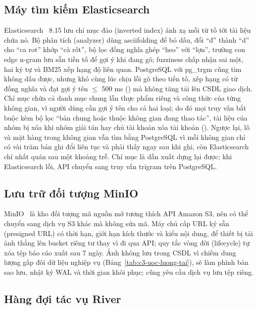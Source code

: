 \subsection{Máy tìm kiếm Elasticsearch}\label{ssec:cn-elasticsearch}

Elasticsearch~\cite{elasticsearch} 8.15 lưu chỉ mục đảo (inverted index) ánh xạ mỗi từ tố tới tài liệu chứa nó. Bộ phân tích (analyzer) dùng asciifolding để bỏ dấu, đổi “đ” thành “d” cho “ca rot” khớp “cà rốt”, bộ lọc đồng nghĩa ghép “heo” với “lợn”, trường con edge n-gram lưu sẵn tiền tố để gợi ý khi đang gõ; fuzziness chấp nhận sai một, hai ký tự và BM25 xếp hạng độ liên quan. PostgreSQL với pg\_trgm cũng tìm không dấu được, nhưng khó cùng lúc chịu lỗi gõ theo tiền tố, xếp hạng có từ đồng nghĩa và đạt gợi ý tên $\le$ 500 ms () mà không tăng tải lên CSDL giao dịch. Chỉ mục chứa cả danh mục chung lẫn thực phẩm riêng và công thức của từng không gian, vì người dùng cần gợi ý tên cho cả hai loại; do đó mọi truy vấn bắt buộc kèm bộ lọc “bản chung hoặc thuộc không gian đang thao tác”, tài liệu của nhóm bị xóa khi nhóm giải tán hay chủ tài khoản xóa tài khoản (). Ngược lại, lô và mặt hàng trong không gian vẫn tìm bằng PostgreSQL vì mỗi không gian chỉ có vài trăm bản ghi đổi liên tục và phải thấy ngay sau khi ghi, còn Elasticsearch chỉ nhất quán sau một khoảng trễ. Chỉ mục là dẫn xuất dựng lại được; khi Elasticsearch lỗi, API chuyển sang truy vấn trigram trên PostgreSQL.

\subsection{Lưu trữ đối tượng MinIO}\label{ssec:cn-minio}

MinIO~\cite{minio} là kho đối tượng mã nguồn mở tương thích API Amazon S3, nên có thể chuyển sang dịch vụ S3 khác mà không sửa mã. Máy chủ cấp URL ký sẵn (presigned URL) có thời hạn, giới hạn kích thước và kiểu nội dung, để thiết bị tải ảnh thẳng lên bucket riêng tư thay vì đi qua API; quy tắc vòng đời (lifecycle) tự xóa tệp báo cáo xuất sau 7 ngày. Ảnh không lưu trong CSDL vì chiếm dung lượng gấp đôi dữ liệu nghiệp vụ (Bảng~\ref{tab:c3-uoc-luong-tai}), sẽ làm phình bản sao lưu, nhật ký WAL và thời gian khôi phục;  cũng yêu cầu dịch vụ lưu tệp riêng.

\subsection{Hàng đợi tác vụ River}\label{ssec:cn-river}

